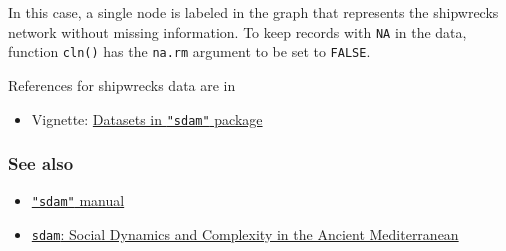 \documentclass[a4paper,11pt]{memoir}
\providecommand{\tightlist}{%
  \setlength{\itemsep}{0pt}\setlength{\parskip}{0pt}}
\let\oldparagraph\paragraph
\renewcommand{\paragraph}[1]{\oldparagraph{#1}\mbox{}}
\begin{document}
In this case, a single node is labeled in the graph that represents the
shipwrecks network without missing information. To keep records with
\texttt{NA} in the data, function \texttt{cln()} has the
\texttt{\textquotesingle{}na.rm\textquotesingle{}} argument to be set to
\texttt{FALSE}.

\bigbreak
\bigbreak

References for shipwrecks data are in

\begin{itemize}
\tightlist
\item
  Vignette: \href{https://cran.r-project.org/web/packages/sdam/vignettes/Intro.html}{Datasets in \texttt{"sdam"} package}
\end{itemize}


\bigbreak
\bigbreak

\hypertarget{see-also}{%
\subsubsection{See also}\label{see-also}}

%   


\begin{itemize}
\tightlist
\item
  \href{https://github.com/mplex/cedhar/blob/master/typesetting/reports/sdam.pdf}{\texttt{"sdam"}
  manual}
\item
  \href{https://CRAN.R-project.org/package=sdam}{\texttt{sdam}: Social Dynamics and
  Complexity in the Ancient Mediterranean}
\end{itemize}
\end{document}
